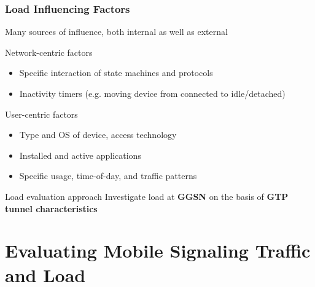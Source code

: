\documentclass{beamer}
\begin{document}
\begin{frame}
	\frametitle{Load Influencing Factors}
	Many sources of influence, both internal as well as external

	Network-centric factors
	\begin{itemize}
		\item Specific interaction of state machines and protocols
		\item Inactivity timers (e.g. moving device from connected to idle/detached)
	\end{itemize}

	\vspace{0.3cm}
	
	User-centric factors
	\begin{itemize}
		\item Type and OS of device, access technology
		\item Installed and active applications
		\item Specific usage, time-of-day, and traffic patterns
	\end{itemize}

	\vspace{0.3cm}

	\pause
	\begin{block}{Load evaluation approach}
		Investigate load at \textbf{GGSN} on the basis of \textbf{GTP tunnel characteristics}
	\end{block}

\end{frame}




\section{Evaluating Mobile Signaling Traffic and Load}
\end{document}

